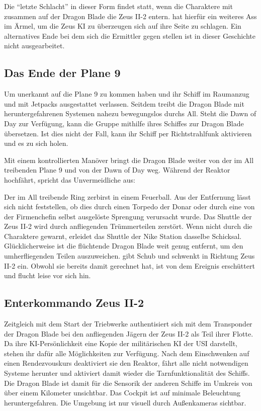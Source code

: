 
Die "`letzte Schlacht"' in dieser Form findet statt, wenn die Charaktere mit \xl{} zusammen auf der Dragon Blade die Zeus II-2 entern. \xl{} hat hierfür ein weiteres Ass im Ärmel, um die Zeus KI zu überzeugen sich auf ihre Seite zu schlagen. Ein alternatives Ende bei dem sich die Ermittler gegen \xl{} stellen ist in dieser Geschichte nicht ausgearbeitet.

\subsection{Das Ende der Plane 9}
Um unerkannt auf die Plane 9 zu kommen haben \xl{} und \ml{} ihr Schiff im Raumanzug und mit Jetpacks ausgestattet verlassen. Seitdem treibt die Dragon Blade mit heruntergefahrenen Systemen nahezu bewegungslos durchs All. Steht die Dawn of Day zur Verfügung, kann die Gruppe mithilfe ihres Schiffes zur Dragon Blade übersetzen. Ist dies nicht der Fall, kann \xl{} ihr Schiff per Richtstrahlfunk aktivieren und es zu sich holen.

Mit einem kontrollierten Manöver bringt \xl{} die Dragon Blade weiter von der im All treibenden Plane 9 und von der Dawn of Day weg. Während der Reaktor hochfährt, spricht \xl{} das Unvermeidliche aus:


Der im All treibende Ring zerbirst in einem Feuerball. Aus der Entfernung lässt sich nicht feststellen, ob dies durch einen Torpedo der Donar oder durch eine von der Firmenchefin selbst ausgelöste Sprengung verursacht wurde. Das Shuttle der Zeus II-2 wird durch anfliegenden Trümmerteilen zerstört. Wenn nicht durch die Charaktere gewarnt, erleidet das Shuttle der Nike Station dasselbe Schicksal. Glücklicherweise ist die flüchtende Dragon Blade weit genug entfernt, um den umherfliegenden Teilen auszuweichen. \xl{} gibt Schub und schwenkt in Richtung Zeus II-2 ein. Obwohl sie bereits damit gerechnet hat, ist \ml{} von dem Ereignis erschüttert und flucht leise vor sich hin.

\subsection{Enterkommando Zeus II-2}
Zeitgleich mit dem Start der Triebwerke authentisiert sich \xl{} mit dem Transponder der Dragon Blade bei den anfliegenden Jägern der Zeus II-2 als Teil ihrer Flotte. Da ihre KI-Persönlichkeit eine Kopie der militärischen KI der USI darstellt, stehen ihr dafür alle Möglichkeiten zur Verfügung. Nach dem Einschwenken auf einen Rendezvouskurs deaktiviert sie den Reaktor, fährt alle nicht notwendigen Systeme herunter und aktiviert damit wieder die Tarnfunktionalität des Schiffs. Die Dragon Blade ist damit für die Sensorik der anderen Schiffe im Umkreis von über einem Kilometer unsichtbar. Das Cockpit ist auf minimale Beleuchtung heruntergefahren. Die Umgebung ist nur visuell durch Außenkameras sichtbar.

